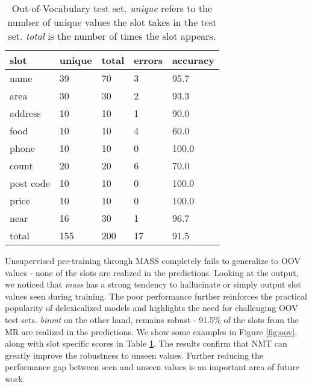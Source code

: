 \documentclass[11pt,a4paper]{article}
\begin{document}
\begin{table}
\centering
\begin{tabular}{l|l|l|l|l}
\hline
slot    & unique & total & errors &  accuracy \\ 
\hline
 name                & 39                     & 70             & 3  & 95.7                          \\
area                           & 30                     & 30             & 2 & 93.3                            \\
address                          & 10                     & 10             & 1     & 90.0                        \\
food                            & 10                     & 10             & 4            & 60.0                \\
phone                 & 10                     & 10             & 0         & 100.0                   \\
count                          & 20                     & 20             & 6       & 70.0                      \\
post code                       & 10                     & 10             & 0            &100.0                \\
price                            & 10                     & 10             & 0  & 100.0                          \\
near                            & 16                     & 30             & 1          & 96.7                  \\
\hline
total          & 155           & 200   & 17   & 91.5 \\
\hline
\end{tabular}
\caption{Out-of-Vocabulary test set. \textsl{unique} refers to the number of unique values the slot takes in the test set. \textsl{total} is the number of times the slot appears.}
\label{results-oov}
\end{table}

Unsupervised pre-training through MASS completely fails to generalize to OOV values - none of the slots are realized in the predictions. Looking at the output, we noticed that \textsl{mass} has a strong tendency to hallucinate or simply output slot values seen during training. The poor performance further reinforces the practical popularity of delexicalized models and highlights the need for challenging OOV test sets. \textsl{binmt} on the other hand, remains robust - 91.5\% of the slots from the MR are realized in the predictions. We show some examples in Figure \ref{fig:oov}, along with slot specific scores in Table \ref{results-oov}. The results confirm that NMT can greatly improve the robustness to unseen values. Further reducing the performance gap between seen and unseen values is an important area of future work.
\end{document}
